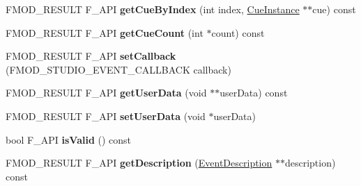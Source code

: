 \begin{DoxyCompactItemize}
\item 
\hypertarget{class_f_m_o_d_1_1_studio_1_1_event_instance_abe8483f5ae0d155f7eb0039afea0ba03}{F\+M\+O\+D\+\_\+\+R\+E\+S\+U\+L\+T F\+\_\+\+A\+P\+I {\bfseries get\+Cue\+By\+Index} (int index, \hyperlink{class_f_m_o_d_1_1_studio_1_1_cue_instance}{Cue\+Instance} $\ast$$\ast$cue) const }\label{class_f_m_o_d_1_1_studio_1_1_event_instance_abe8483f5ae0d155f7eb0039afea0ba03}

\item 
\hypertarget{class_f_m_o_d_1_1_studio_1_1_event_instance_a86d15552cb0a51bf7cbcf81b6f65d6d3}{F\+M\+O\+D\+\_\+\+R\+E\+S\+U\+L\+T F\+\_\+\+A\+P\+I {\bfseries get\+Cue\+Count} (int $\ast$count) const }\label{class_f_m_o_d_1_1_studio_1_1_event_instance_a86d15552cb0a51bf7cbcf81b6f65d6d3}

\item 
\hypertarget{class_f_m_o_d_1_1_studio_1_1_event_instance_a3b668a1fd82263dd0676a99f5f40ab1f}{F\+M\+O\+D\+\_\+\+R\+E\+S\+U\+L\+T F\+\_\+\+A\+P\+I {\bfseries set\+Callback} (F\+M\+O\+D\+\_\+\+S\+T\+U\+D\+I\+O\+\_\+\+E\+V\+E\+N\+T\+\_\+\+C\+A\+L\+L\+B\+A\+C\+K callback)}\label{class_f_m_o_d_1_1_studio_1_1_event_instance_a3b668a1fd82263dd0676a99f5f40ab1f}

\item 
\hypertarget{class_f_m_o_d_1_1_studio_1_1_event_instance_a6888e3fc82e2f760eadda1932f734361}{F\+M\+O\+D\+\_\+\+R\+E\+S\+U\+L\+T F\+\_\+\+A\+P\+I {\bfseries get\+User\+Data} (void $\ast$$\ast$user\+Data) const }\label{class_f_m_o_d_1_1_studio_1_1_event_instance_a6888e3fc82e2f760eadda1932f734361}

\item 
\hypertarget{class_f_m_o_d_1_1_studio_1_1_event_instance_a424d43aa6ff7772a041825fe1a54cd56}{F\+M\+O\+D\+\_\+\+R\+E\+S\+U\+L\+T F\+\_\+\+A\+P\+I {\bfseries set\+User\+Data} (void $\ast$user\+Data)}\label{class_f_m_o_d_1_1_studio_1_1_event_instance_a424d43aa6ff7772a041825fe1a54cd56}

\item 
\hypertarget{class_f_m_o_d_1_1_studio_1_1_event_instance_a74aa3fc1877fa3d0c88bdf2913326811}{bool F\+\_\+\+A\+P\+I {\bfseries is\+Valid} () const }\label{class_f_m_o_d_1_1_studio_1_1_event_instance_a74aa3fc1877fa3d0c88bdf2913326811}

\item 
\hypertarget{class_f_m_o_d_1_1_studio_1_1_event_instance_a0dd4629dbf049565009f4932c6110f3a}{F\+M\+O\+D\+\_\+\+R\+E\+S\+U\+L\+T F\+\_\+\+A\+P\+I {\bfseries get\+Description} (\hyperlink{class_f_m_o_d_1_1_studio_1_1_event_description}{Event\+Description} $\ast$$\ast$description) const }\label{class_f_m_o_d_1_1_studio_1_1_event_instance_a0dd4629dbf049565009f4932c6110f3a}


\end{DoxyCompactItemize}

